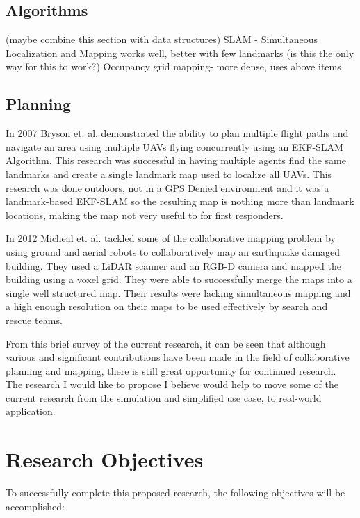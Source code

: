 \documentclass[12pt, letterpaper]{article}
\begin{document}
\subsection{Algorithms} (maybe combine this section with data structures)
SLAM - Simultaneous Localization and Mapping works well, better with few landmarks (is this the only way for this to work?)
Occupancy grid mapping- more dense, uses above items

\subsection{Planning}
In 2007 Bryson et. al. \cite{Bryson2007} demonstrated the ability to plan multiple flight paths and navigate an area using multiple UAVs flying concurrently using an EKF-SLAM Algorithm. This research was successful in having multiple agents find the same landmarks and create a single landmark map used to localize all UAVs. This research was done outdoors, not in a GPS Denied environment and it was a landmark-based EKF-SLAM so the resulting map is nothing more than landmark locations, making the map not very useful to for first responders. 
 
In 2012 Micheal et. al. \cite{Michael2012} tackled some of the collaborative mapping problem by using ground and aerial robots to collaboratively map an earthquake damaged building. They used a LiDAR scanner and an RGB-D camera and mapped the building using a voxel grid. They were able to successfully merge the maps into a single well structured map. Their results were lacking simultaneous mapping and a high enough resolution on their maps to be used effectively by search and rescue teams.   

From this brief survey of the current research, it can be seen that although various and significant contributions have been made in the field of collaborative planning and mapping, there is still great opportunity for continued research.  The research I would like to propose I believe would help to move some of the current research from the simulation and simplified use case, to real-world application.

\section{Research Objectives}

To successfully complete this proposed research, the following objectives will be accomplished:
\end{document}
